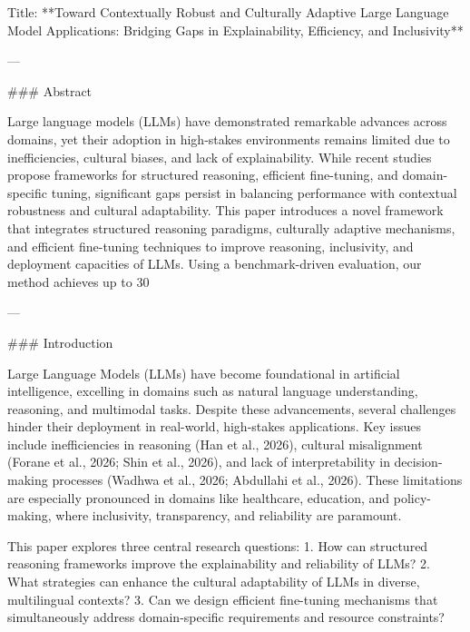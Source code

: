 Title: **Toward Contextually Robust and Culturally Adaptive Large Language Model Applications: Bridging Gaps in Explainability, Efficiency, and Inclusivity**

---

### Abstract

Large language models (LLMs) have demonstrated remarkable advances across domains, yet their adoption in high-stakes environments remains limited due to inefficiencies, cultural biases, and lack of explainability. While recent studies propose frameworks for structured reasoning, efficient fine-tuning, and domain-specific tuning, significant gaps persist in balancing performance with contextual robustness and cultural adaptability. This paper introduces a novel framework that integrates structured reasoning paradigms, culturally adaptive mechanisms, and efficient fine-tuning techniques to improve reasoning, inclusivity, and deployment capacities of LLMs. Using a benchmark-driven evaluation, our method achieves up to 30%

---

### Introduction

Large Language Models (LLMs) have become foundational in artificial intelligence, excelling in domains such as natural language understanding, reasoning, and multimodal tasks. Despite these advancements, several challenges hinder their deployment in real-world, high-stakes applications. Key issues include inefficiencies in reasoning (Han et al., 2026), cultural misalignment (Forane et al., 2026; Shin et al., 2026), and lack of interpretability in decision-making processes (Wadhwa et al., 2026; Abdullahi et al., 2026). These limitations are especially pronounced in domains like healthcare, education, and policy-making, where inclusivity, transparency, and reliability are paramount.

This paper explores three central research questions:
1. How can structured reasoning frameworks improve the explainability and reliability of LLMs?
2. What strategies can enhance the cultural adaptability of LLMs in diverse, multilingual contexts?
3. Can we design efficient fine-tuning mechanisms that simultaneously address domain-specific requirements and resource constraints?

